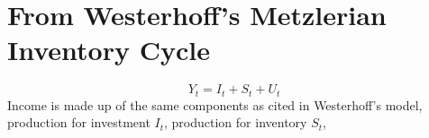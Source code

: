 \documentclass[]{article}
\begin{document}
\section*{From Westerhoff's Metzlerian Inventory Cycle}
	\begin{equation}
		Y_t=I_t+S_t+U_t
	\end{equation}
	Income is made up of the same components as cited in Westerhoff's model, production for investment $I_t$, production for inventory $S_t$, 
\end{document}
